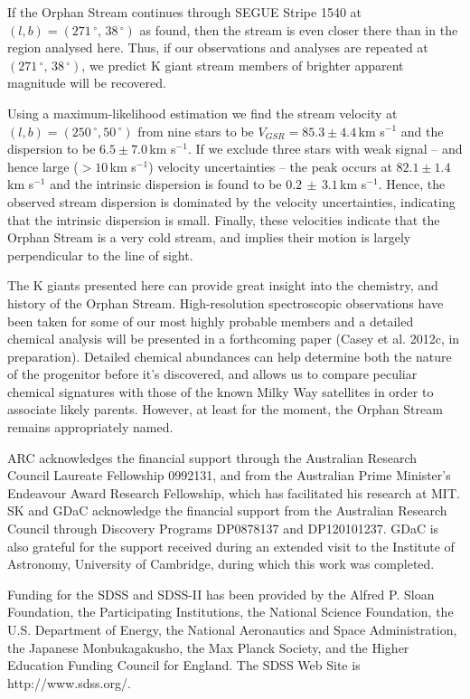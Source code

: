 \documentclass[10pt,apjl]{emulateapj}
\begin{document}
If the Orphan Stream continues through SEGUE Stripe 1540 at $(l, b) = (271\,^\circ,\,38\,^\circ)$ as \citet{Newberg_et-al_2010} found, then the stream is even closer there than in the region analysed here. Thus, if our observations and analyses are repeated at $(271\,^\circ,\,38\,^\circ)$, we predict K giant stream members of brighter apparent magnitude will be recovered.

Using a maximum-likelihood estimation we find the stream velocity at $(l, b) = (250\,^\circ, 50\,^\circ)$ from nine stars to be $V_{GSR} = 85.3 \pm 4.4$\,km s$^{-1}$ and the dispersion to be $6.5 \pm 7.0$\,km s$^{-1}$. If we exclude three stars with weak signal \--- and hence large ($> 10$\,km s$^{-1}$) velocity uncertainties \--- the peak occurs at $82.1 \pm 1.4$\,km s$^{-1}$ and the intrinsic dispersion is found to be $0.2\,\pm\,3.1$\,km s$^{-1}$. Hence, the observed stream dispersion is dominated by the velocity uncertainties, indicating that the intrinsic dispersion is small. Finally, these velocities indicate that the Orphan Stream is a very cold stream, and implies their motion is largely perpendicular to the line of sight.

The K giants presented here can provide great insight into the chemistry, and history of the Orphan Stream. High-resolution spectroscopic observations have been taken for some of our most highly probable members and a detailed chemical analysis will be presented in a forthcoming paper (Casey et al. 2012c, in preparation). Detailed chemical abundances can help determine both the nature of the progenitor before it's discovered, and allows us to compare peculiar chemical signatures with those of the known Milky Way satellites in order to associate likely parents. However, at least for the moment, the Orphan Stream remains appropriately named.


\acknowledgements
ARC acknowledges the financial support through the Australian Research Council Laureate Fellowship 0992131, and from the Australian Prime Minister's Endeavour Award Research Fellowship, which has facilitated his research at MIT. SK and GDaC acknowledge the financial support from the Australian Research Council through Discovery Programs DP0878137 and DP120101237. GDaC is also grateful for the support received during an extended visit to the Institute of Astronomy, University of Cambridge, during which this work was completed.

Funding for the SDSS and SDSS-II has been provided by the Alfred P. Sloan Foundation, the Participating Institutions, the National Science Foundation, the U.S. Department of Energy, the National Aeronautics and Space Administration, the Japanese Monbukagakusho, the Max Planck Society, and the Higher Education Funding Council for England. The SDSS Web Site is http://www.sdss.org/.
\end{document}

